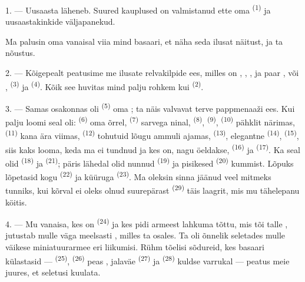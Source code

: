 \VUsaut{4.0mm}
\VUsaut{2.0mm}
\VUsaut{3.4mm}

1. --- Uusaasta läheneb. Suured kauplused on valmistanud ette oma 
\textsuperscript{(1)} ja uusaastakinkide väljapanekud.

Ma palusin oma vanaisal viia mind basaari, et näha seda ilusat näitust, ja ta nõustus.

2. --- Kõigepealt peatusime me ilusate relvakilpide ees, milles on ,
, ,  ja paar , või
,  \textsuperscript{(3)} ja 
\textsuperscript{(4)}. Kõik see huvitas mind palju rohkem kui 
\textsuperscript{(2)}.

\VUsaut{3.0mm}
\VUsaut{2.6mm}

3. --- Samas osakonnas oli  \textsuperscript{(5)} oma
; ta näis valvavat terve pappmenaaži ees. Kui palju loomi seal oli:
 \textsuperscript{(6)} oma õrrel, 
\textsuperscript{(7)} sarvega ninal,  \textsuperscript{(8)},
 \textsuperscript{(9)},  \textsuperscript{(10)} pähklit
närimas,  \textsuperscript{(11)} kana ära viimas, 
\textsuperscript{(12)} tohutuid lõugu ammuli ajamas, 
\textsuperscript{(13)}, elegantne  \textsuperscript{(14)}, 
\textsuperscript{(15)}, siis kaks looma, keda ma ei tundnud ja kes on, nagu öeldakse,
 \textsuperscript{(16)} ja  \textsuperscript{(17)}. Ka seal olid
 \textsuperscript{(18)} ja  \textsuperscript{(21)}; päris
lähedal olid nunnud  \textsuperscript{(19)} ja pisikesed
 \textsuperscript{(20)} kummist. Lõpuks lõpetasid kogu
 \textsuperscript{(22)} ja küüruga 
\textsuperscript{(23)}. Ma oleksin sinna jäänud veel mitmeks tunniks, kui kõrval ei oleks
olnud suurepärast  \textsuperscript{(29)} täis laagrit, mis mu
tähelepanu köitis.

\VUsaut{4.0mm}
\VUsaut{2.8mm}

4. --- Mu vanaisa, kes on  \textsuperscript{(24)} ja kes pidi armeest
lahkuma  tõttu, mis tõi talle , jutustab mulle väga
meelsasti , milles ta osales. Ta oli õnnelik seletades mulle
väikese miniatuurarmee eri liikumisi. Rühm tõelisi sõdureid, kes basaari külastasid ---
 \textsuperscript{(25)},  \textsuperscript{(26)} peas
, jalaväe  \textsuperscript{(27)} ja  \textsuperscript{(28)} kuldse  varrukal --- peatus meie juures,
et seletusi kuulata.


